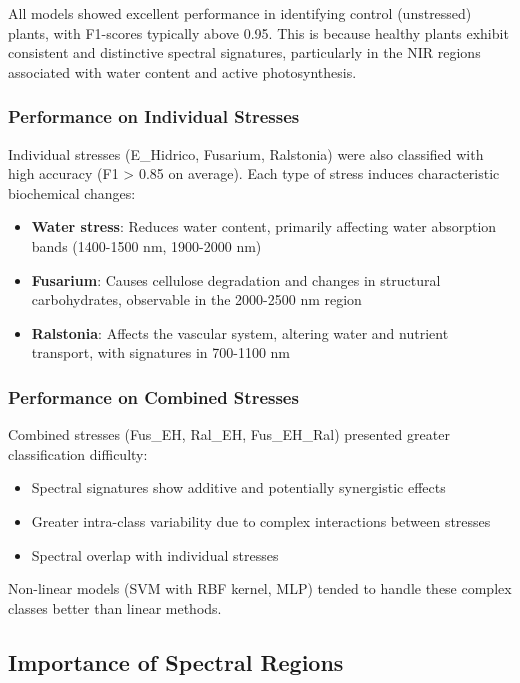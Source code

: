 \documentclass[12pt,a4paper]{article}
\begin{document}
All models showed excellent performance in identifying control (unstressed) plants, with F1-scores typically above 0.95. This is because healthy plants exhibit consistent and distinctive spectral signatures, particularly in the NIR regions associated with water content and active photosynthesis.

\subsubsection{Performance on Individual Stresses}

Individual stresses (E\_Hidrico, Fusarium, Ralstonia) were also classified with high accuracy (F1 > 0.85 on average). Each type of stress induces characteristic biochemical changes:

\begin{itemize}
    \item \textbf{Water stress}: Reduces water content, primarily affecting water absorption bands (1400-1500 nm, 1900-2000 nm)
    \item \textbf{Fusarium}: Causes cellulose degradation and changes in structural carbohydrates, observable in the 2000-2500 nm region
    \item \textbf{Ralstonia}: Affects the vascular system, altering water and nutrient transport, with signatures in 700-1100 nm
\end{itemize}

\subsubsection{Performance on Combined Stresses}

Combined stresses (Fus\_EH, Ral\_EH, Fus\_EH\_Ral) presented greater classification difficulty:

\begin{itemize}
    \item Spectral signatures show additive and potentially synergistic effects
    \item Greater intra-class variability due to complex interactions between stresses
    \item Spectral overlap with individual stresses
\end{itemize}

Non-linear models (SVM with RBF kernel, MLP) tended to handle these complex classes better than linear methods.

\subsection{Importance of Spectral Regions}
\end{document}
